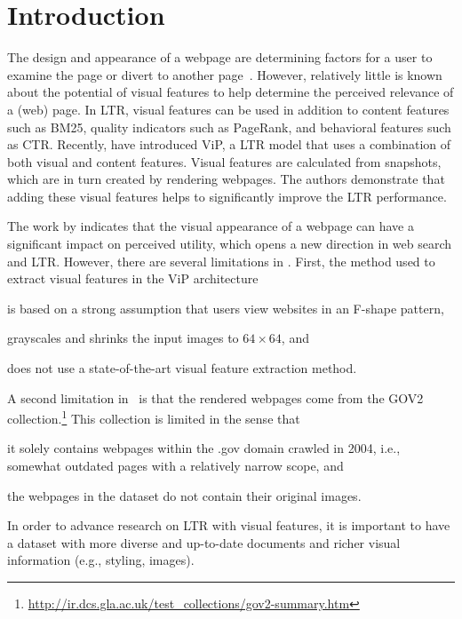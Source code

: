 
\section{Introduction}
The design and appearance of a webpage are determining factors for a user to examine the page or divert to another page~\cite{nielsen1999designing,nielsen2006f,pernice2017f,wang2014eye}.
However, relatively little is known about the potential of visual features to help determine the perceived relevance of a (web) page. In \acf{LTR}, visual features can be used in addition to content features such as BM25, quality indicators such as PageRank, and behavioral features such as CTR.
Recently, \citet{fan2017learning} have introduced ViP, a \ac{LTR} model that uses a combination of both visual and content features.
Visual features are calculated from snapshots, which are in turn created by rendering webpages.
The authors demonstrate that adding these visual features helps to significantly improve the \ac{LTR} performance.

The work by \citet{fan2017learning} indicates that the visual appearance of a webpage can have a significant impact on perceived utility, which opens a new direction in web search and \ac{LTR}.
However, there are several limitations in \cite{fan2017learning}.
First, the method used to extract visual features in the ViP architecture
\begin{inparaenum}[(i)]
\item is based on a strong assumption that users view websites in an F-shape pattern, 
\item grayscales and shrinks the input images to $64\times64$, and
\item does not use a state-of-the-art visual feature extraction method.
\end{inparaenum}

A second limitation in~\citep{fan2017learning} is that
the rendered webpages come from the GOV2 collection.\footnote{\url{http://ir.dcs.gla.ac.uk/test_collections/gov2-summary.htm}}
This collection is limited in the sense that 
\begin{inparaenum}[(i)]
\item it solely contains webpages within the .gov domain crawled in 2004, i.e., somewhat outdated pages with a relatively narrow scope, and
\item the webpages in the dataset do not contain their original images.
\end{inparaenum}
In order to advance research on \ac{LTR} with visual features, it is important to have a dataset with more diverse and up-to-date documents and richer visual information (e.g., styling, images).

